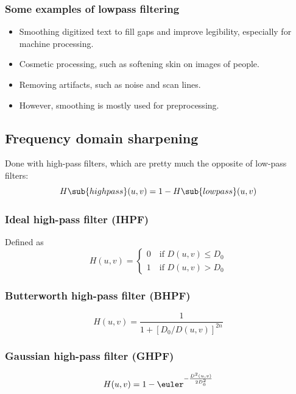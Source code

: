 \subsubsection{Some examples of lowpass filtering}
\begin{itemize}
    \item Smoothing digitized text to fill gaps and improve legibility, especially for machine processing.
    \item Cosmetic processing, such as softening skin on images of people.
    \item Removing artifacts, such as noise and scan lines.
    \item However, smoothing is mostly used for preprocessing.
\end{itemize}

\subsection{Frequency domain sharpening}
Done with high-pass filters, which are pretty much the opposite of low-pass filters:
\begin{equation}\label{eq:frequency-hp-lp-relation}
    H\sub{highpass}(u,v) = 1 - H\sub{lowpass}(u,v)
\end{equation}

\subsubsection{Ideal high-pass filter (IHPF)}
Defined as
\begin{equation}
    H(u,v) =
    \begin{cases}
        0 \quad\mbox{if } D(u,v) \leq D_0 \\
        1 \quad\mbox{if } D(u,v) >    D_0
    \end{cases}
\end{equation}

\subsubsection{Butterworth high-pass filter (BHPF)}
\begin{equation}
    H(u,v) =
    \frac{1}{1 + [D_0 / D(u,v)]^{2n}}
\end{equation}

\subsubsection{Gaussian high-pass filter (GHPF)}
\begin{equation}
    H(u,v) = 1 - \euler^{-\frac{D^2(u,v)}{2 D_0^2}}
\end{equation}

